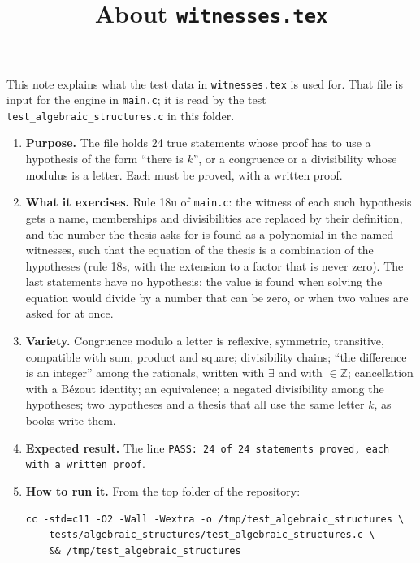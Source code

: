 \documentclass[11pt,a4paper]{article}
\title{About \texttt{witnesses.tex}}
\author{}
\date{}
\begin{document}
\maketitle
This note explains what the test data in \texttt{witnesses.tex} is used for. That file is input for the engine in \texttt{main.c}; it is read by the test \texttt{test\_algebraic\_structures.c} in this folder.

\begin{enumerate}
\item \textbf{Purpose.} The file holds 24 true statements whose proof has to use a hypothesis of the form ``there is $k$'', or a congruence or a divisibility whose modulus is a letter. Each must be proved, with a written proof.

\item \textbf{What it exercises.} Rule 18u of \texttt{main.c}: the witness of each such hypothesis gets a name, memberships and divisibilities are replaced by their definition, and the number the thesis asks for is found as a polynomial in the named witnesses, such that the equation of the thesis is a combination of the hypotheses (rule 18s, with the extension to a factor that is never zero). The last statements have no hypothesis: the value is found when solving the equation would divide by a number that can be zero, or when two values are asked for at once.

\item \textbf{Variety.} Congruence modulo a letter is reflexive, symmetric, transitive, compatible with sum, product and square; divisibility chains; ``the difference is an integer'' among the rationals, written with $\exists$ and with $\in \mathbb{Z}$; cancellation with a B\'ezout identity; an equivalence; a negated divisibility among the hypotheses; two hypotheses and a thesis that all use the same letter $k$, as books write them.

\item \textbf{Expected result.} The line \texttt{PASS: 24 of 24 statements proved, each with a written proof}.

\item \textbf{How to run it.} From the top folder of the repository:
\begin{verbatim}
cc -std=c11 -O2 -Wall -Wextra -o /tmp/test_algebraic_structures \
    tests/algebraic_structures/test_algebraic_structures.c \
    && /tmp/test_algebraic_structures
\end{verbatim}
\end{enumerate}
\end{document}
